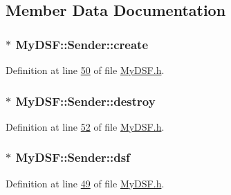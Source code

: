 \subsection{Member Data Documentation}
\hypertarget{class_my_d_s_f_1_1_sender_a44b80ad5f2e1c9b66b2beccdca6f2e9a}{}
\subsubsection[{create}]{$\ast$ My\+D\+S\+F\+::\+Sender\+::create}\label{class_my_d_s_f_1_1_sender_a44b80ad5f2e1c9b66b2beccdca6f2e9a}


Definition at line \hyperlink{_my_d_s_f_8h_source_l00050}{50} of file \hyperlink{_my_d_s_f_8h_source}{My\+D\+S\+F.\+h}.

\hypertarget{class_my_d_s_f_1_1_sender_a15d42b9428ac6e290d84937824058bc2}{}
\subsubsection[{destroy}]{$\ast$ My\+D\+S\+F\+::\+Sender\+::destroy}\label{class_my_d_s_f_1_1_sender_a15d42b9428ac6e290d84937824058bc2}


Definition at line \hyperlink{_my_d_s_f_8h_source_l00052}{52} of file \hyperlink{_my_d_s_f_8h_source}{My\+D\+S\+F.\+h}.

\hypertarget{class_my_d_s_f_1_1_sender_a74dc0baa462ddc42b3b032fdf8b5c224}{}
\subsubsection[{dsf}]{$\ast$ My\+D\+S\+F\+::\+Sender\+::dsf}\label{class_my_d_s_f_1_1_sender_a74dc0baa462ddc42b3b032fdf8b5c224}


Definition at line \hyperlink{_my_d_s_f_8h_source_l00049}{49} of file \hyperlink{_my_d_s_f_8h_source}{My\+D\+S\+F.\+h}.

\hypertarget{class_my_d_s_f_1_1_sender_a15eb7f6b4e8124216e7fd29369543095}{}

